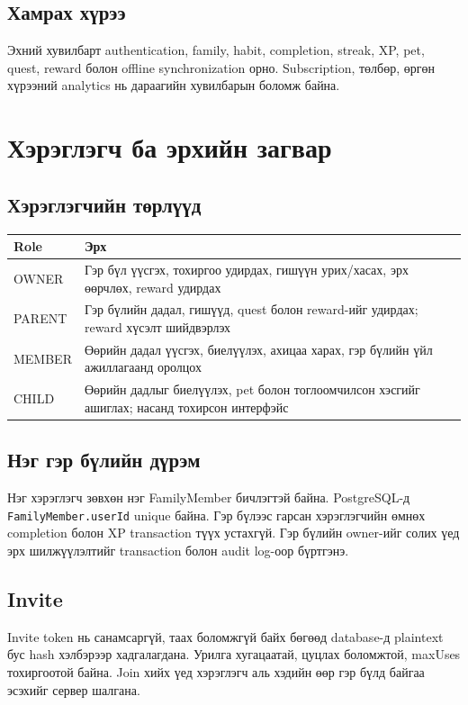 \documentclass[12pt,a4paper,oneside]{report}
\begin{document}
\section{Хамрах хүрээ}
Эхний хувилбарт authentication, family, habit, completion, streak, XP, pet, quest, reward болон offline synchronization орно. Subscription, төлбөр, өргөн хүрээний analytics нь дараагийн хувилбарын боломж байна.

\chapter{Хэрэглэгч ба эрхийн загвар}

\section{Хэрэглэгчийн төрлүүд}
\begin{longtable}{p{}p{}}
\toprule
\textbf{Role} & \textbf{Эрх}\\
\midrule
OWNER & Гэр бүл үүсгэх, тохиргоо удирдах, гишүүн урих/хасах, эрх өөрчлөх, reward удирдах\\
PARENT & Гэр бүлийн дадал, гишүүд, quest болон reward-ийг удирдах; reward хүсэлт шийдвэрлэх\\
MEMBER & Өөрийн дадал үүсгэх, биелүүлэх, ахицаа харах, гэр бүлийн үйл ажиллагаанд оролцох\\
CHILD & Өөрийн дадлыг биелүүлэх, pet болон тоглоомчилсон хэсгийг ашиглах; насанд тохирсон интерфэйс\\
\bottomrule
\end{longtable}

\section{Нэг гэр бүлийн дүрэм}
Нэг хэрэглэгч зөвхөн нэг FamilyMember бичлэгтэй байна. PostgreSQL-д \texttt{FamilyMember.userId} unique байна. Гэр бүлээс гарсан хэрэглэгчийн өмнөх completion болон XP transaction түүх устахгүй. Гэр бүлийн owner-ийг солих үед эрх шилжүүлэлтийг transaction болон audit log-оор бүртгэнэ.

\section{Invite}
Invite token нь санамсаргүй, таах боломжгүй байх бөгөөд database-д plaintext бус hash хэлбэрээр хадгалагдана. Урилга хугацаатай, цуцлах боломжтой, maxUses тохиргоотой байна. Join хийх үед хэрэглэгч аль хэдийн өөр гэр бүлд байгаа эсэхийг сервер шалгана.
\end{document}
